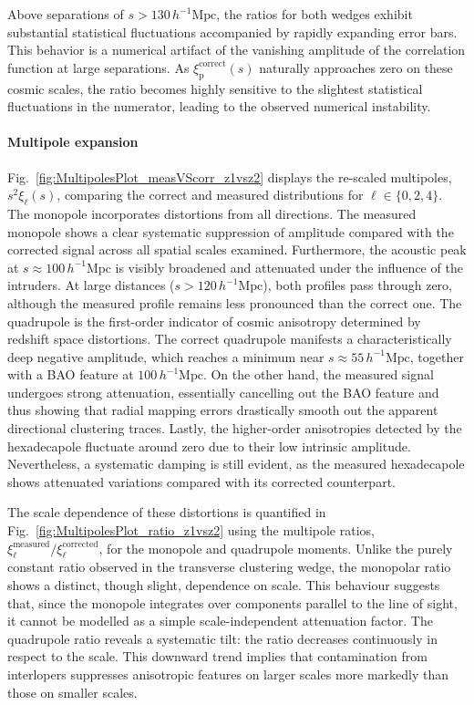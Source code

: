 \documentclass[12pt,a4paper,oneside]{report}
\begin{document}
Above separations of $s > 130 \, h^{-1} \mathrm{Mpc}$, the ratios for both wedges exhibit substantial statistical fluctuations accompanied by rapidly expanding error bars. This behavior is a numerical artifact of the vanishing amplitude of the correlation function at large separations. As $\xi_\mathrm{p}^{\mathrm{correct}}(s)$ naturally approaches zero on these cosmic scales, the ratio becomes highly sensitive to the slightest statistical fluctuations in the numerator, leading to the observed numerical instability.

\paragraph{Multipole expansion}
Fig.~\ref{fig:MultipolesPlot_measVScorr_z1vsz2} displays the re-scaled multipoles, $s^2\xi_{\ell}(s)$, comparing the correct and measured distributions for $\ell \in \{ 0,2,4 \}$. The monopole incorporates distortions from all directions. The measured monopole shows a clear systematic suppression of amplitude compared with the corrected signal across all spatial scales examined. Furthermore, the acoustic peak at $s \approx 100 \, h^{-1}\mathrm{Mpc}$ is visibly broadened and attenuated under the influence of the intruders. At large distances ($s > 120 \, h^{-1}\mathrm{Mpc}$), both profiles pass through zero, although the measured profile remains less pronounced than the correct one. The quadrupole is the first-order indicator of cosmic anisotropy determined by redshift space distortions. The correct quadrupole  manifests a characteristically deep negative amplitude, which reaches a minimum near $s \approx 55 \, h^{-1}\mathrm{Mpc}$, together with a BAO feature at $100 \, h^{-1}\mathrm{Mpc}$. On the other hand, the measured signal undergoes strong attenuation, essentially cancelling out the BAO feature and thus showing that radial mapping errors drastically smooth out the apparent directional clustering traces. Lastly, the higher-order anisotropies detected by the hexadecapole fluctuate around zero due to their low intrinsic amplitude. Nevertheless, a systematic damping is still evident, as the measured hexadecapole shows attenuated variations compared with its corrected counterpart.

The scale dependence of these distortions is quantified in Fig.~\ref{fig:MultipolesPlot_ratio_z1vsz2} using the multipole ratios, $\xi_{\ell}^{\mathrm{measured}} / \xi_{\ell}^{\mathrm{corrected}}$, for the monopole and quadrupole moments. Unlike the purely constant ratio observed in the transverse clustering wedge, the monopolar ratio shows a distinct, though slight, dependence on scale. This behaviour suggests that, since the monopole integrates over components parallel to the line of sight, it cannot be modelled as a simple scale-independent attenuation factor. The quadrupole ratio reveals a systematic tilt: the ratio decreases continuously in respect to the scale. This downward trend implies that contamination from interlopers suppresses anisotropic features on larger scales more markedly than those on smaller scales.
\end{document}
